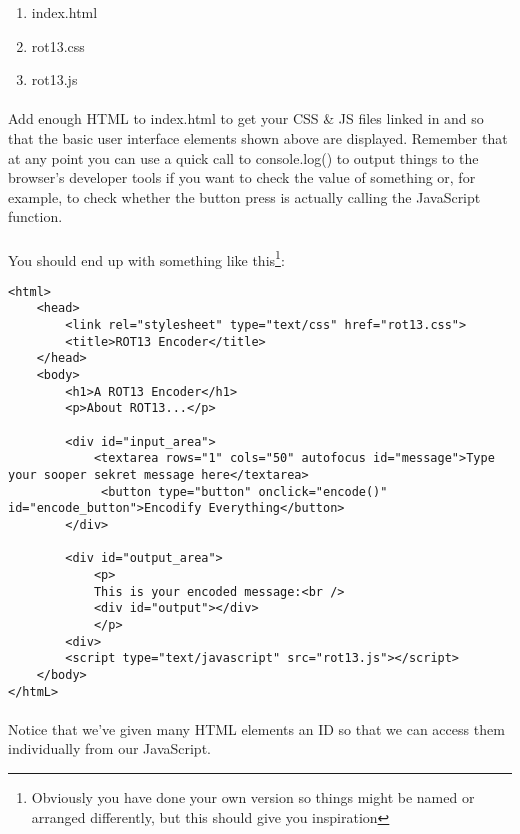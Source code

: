 \documentclass[10pt, a4paper, twosize]{article}
\begin{document}
\begin{enumerate}
\item index.html
\item rot13.css
\item rot13.js
\end{enumerate}

\paragraph{} Add enough HTML to index.html to get your CSS \& JS files linked in and so that the basic user interface elements shown above are displayed. Remember that at any point you can use a quick call to console.log() to output things to the browser's developer tools if you want to check the value of something or, for example, to check whether the button press is actually calling the JavaScript function.

\paragraph{} You should end up with something like this\footnote{Obviously you have done your own version so things might be named or arranged differently, but this should give you inspiration}:

\begin{lstlisting}
<html>
    <head>
        <link rel="stylesheet" type="text/css" href="rot13.css">
        <title>ROT13 Encoder</title>
    </head>
    <body>
        <h1>A ROT13 Encoder</h1>
        <p>About ROT13...</p>
   
        <div id="input_area">
            <textarea rows="1" cols="50" autofocus id="message">Type your sooper sekret message here</textarea>
             <button type="button" onclick="encode()" id="encode_button">Encodify Everything</button> 
        </div>
        
        <div id="output_area">
            <p>
            This is your encoded message:<br />
            <div id="output"></div>
            </p>
        <div>
        <script type="text/javascript" src="rot13.js"></script>    
    </body>
</htmL>
\end{lstlisting}

\paragraph{} Notice that we've given many HTML elements an ID so that we can access them individually from our JavaScript.
\end{document}
